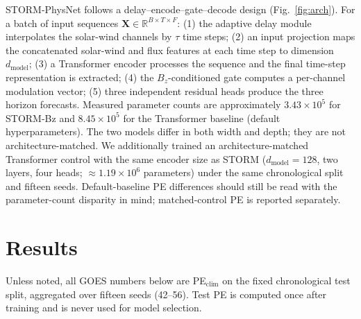 \documentclass{ieeeaccess}
\begin{document}
STORM-PhysNet follows a delay--encode--gate--decode design
(Fig.~\ref{fig:arch}). For a batch of input sequences
\(\mathbf{X}\in\mathbb{R}^{B\times T\times F}\):
(1) the adaptive delay module interpolates the solar-wind channels by \(\tau\)
time steps;
(2) an input projection maps the concatenated solar-wind and flux features at each
time step to dimension \(d_{\mathrm{model}}\);
(3) a Transformer encoder processes the sequence and the final time-step
representation is extracted;
(4) the \(B_z\)-conditioned gate computes a per-channel modulation vector;
(5) three independent residual heads produce the three horizon forecasts.
Measured parameter counts are approximately $3.43\times10^{5}$ for
STORM-Bz and $8.45\times10^{5}$ for the Transformer baseline
(default hyperparameters). The two models differ in both width and depth;
they are not architecture-matched. We additionally trained an architecture-matched
Transformer control with the same encoder size as STORM
($d_{\mathrm{model}}=128$, two layers, four heads;
$\approx1.19\times10^{6}$ parameters) under the same chronological split and
fifteen seeds. Default-baseline PE differences should still be read with the
parameter-count disparity in mind; matched-control PE is reported separately.






\section{Results}
\label{sec:results}

Unless noted, all GOES numbers below are PE$_{\mathrm{clim}}$ on the fixed
chronological test split, aggregated over fifteen seeds (42--56).
Test PE is computed once after training and is never used for model selection.
\end{document}
